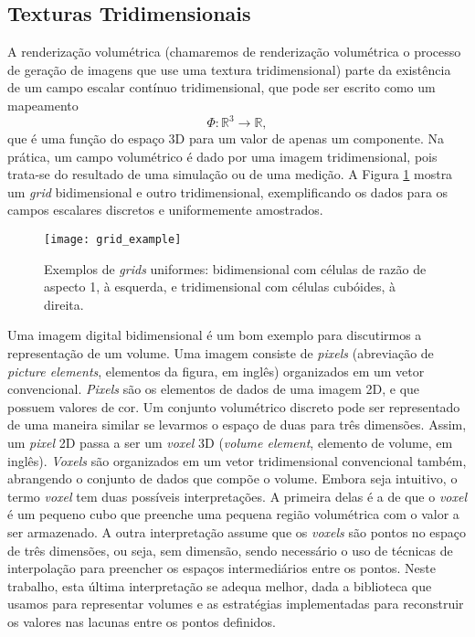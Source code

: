 \begin{figure}[!htb]

\end{figure}

\subsection{Texturas Tridimensionais}
\label{texturas3d}

A renderização volumétrica (chamaremos de renderização volumétrica o processo de geração de imagens que use uma textura tridimensional) parte da existência de um campo escalar contínuo tridimensional, que pode ser escrito como um mapeamento
\[ \Phi : \mathbb{R}^{3} \rightarrow \mathbb{R},
\]
que é uma função do espaço 3D para um valor de apenas um componente.
Na prática, um campo volumétrico é dado por uma imagem tridimensional, pois trata-se do resultado de uma simulação ou de uma medição. A Figura \ref{grid_ex} mostra um \emph{grid} bidimensional e outro tridimensional, exemplificando os dados para os campos escalares discretos e uniformemente amostrados.

\begin{figure}[!htb]
\center
\texttt{[image: grid\_example]}
\caption{Exemplos de \emph{grids} uniformes: bidimensional com células de razão de aspecto 1, à esquerda, e tridimensional com células cubóides, à direita.}
\label{grid_ex}
\end{figure}

Uma imagem digital bidimensional é um bom exemplo para discutirmos a representação de um volume. Uma imagem consiste de {\it pixels} (abreviação de {\it picture elements}, elementos da figura, em inglês) organizados em um vetor convencional. {\it Pixels} são os elementos de dados de uma imagem 2D, e que possuem valores de cor.
Um conjunto volumétrico discreto pode ser representado de uma maneira similar se levarmos o espaço de duas para três dimensões. Assim, um \emph{pixel} 2D passa a ser um {\it voxel} 3D ({\it volume element}, elemento de volume, em inglês). {\it Voxels} são organizados em um vetor tridimensional convencional também, abrangendo o conjunto de dados que compõe o volume.
Embora seja intuitivo, o termo {\it voxel} tem duas possíveis interpretações. A primeira delas é a de que o {\it voxel} é um pequeno cubo que preenche uma pequena região volumétrica com o valor a ser armazenado. A outra interpretação assume que os {\it voxels} são pontos no espaço de três dimensões, ou seja, sem dimensão, sendo necessário o uso de técnicas de interpolação para preencher os espaços intermediários entre os pontos. Neste trabalho, esta última interpretação se adequa melhor, dada a biblioteca que usamos para representar volumes e as estratégias implementadas para reconstruir os valores nas lacunas entre os pontos definidos. \\

